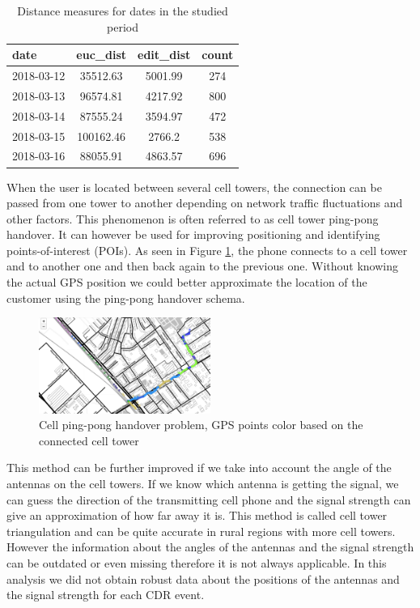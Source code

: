 \begin{table}[h]
    \centering
    \begin{tabular}{|l|c|c|c|}
        \hline
        \textbf{date} & \textbf{euc\_dist} & \textbf{edit\_dist} & \textbf{count}\\
        \hline
        2018-03-12 & 35512.63 & 5001.99 & 274 \\
        \hline
        2018-03-13 & 96574.81 & 4217.92 & 800 \\
        \hline
        2018-03-14 & 87555.24 & 3594.97 & 472 \\
        \hline
        2018-03-15 & 100162.46 & 2766.2 & 538 \\
        \hline
        2018-03-16 & 88055.91 & 4863.57 & 696 \\
        \hline
    \end{tabular}
    \caption{Distance measures for dates in the studied period}
    \label{tab:distances}
\end{table}

When the user is located between several cell towers, the connection can be passed from one tower to another depending on network traffic fluctuations and other factors. This phenomenon is often referred to as cell tower ping-pong handover. It can however be used for improving positioning and identifying points-of-interest (POIs). As seen in Figure \ref{fig:ping-pong}, the phone connects to a cell tower and to another one and then back again to the previous one. Without knowing the actual GPS position we could better approximate the location of the customer using the ping-pong handover schema.

\begin{figure}[h]
    \centering
    \includegraphics[width=0.5\textwidth]{images/ping-pong.png}
    \caption{Cell ping-pong handover problem, GPS points color based on the connected cell tower}
    \label{fig:ping-pong}
\end{figure}

This method can be further improved if we take into account the angle of the antennas on the cell towers. If we know which antenna is getting the signal, we can guess the direction of the transmitting cell phone and the signal strength can give an approximation of how far away it is. This method is called cell tower triangulation and can be quite accurate in rural regions with more cell towers. However the information about the angles of the antennas and the signal strength can be outdated or even missing therefore it is not always applicable. In this analysis we did not obtain robust data about the positions of the antennas and the signal strength for each CDR event.

